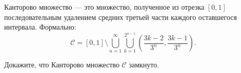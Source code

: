 \begin{definition}
	Канторово множество — это множество, полученное из отрезка $[0,1]$ последовательным удалением средних третьей части каждого оставшегося интервала. Формально:  
\[
\mathcal{C} = [0,1] \setminus \bigcup_{n=1}^\infty \bigcup_{k=1}^{2^{n-1}} \left( \frac{3k-2}{3^n}, \frac{3k-1}{3^n} \right).
\]  

\end{definition}

\begin{task}
	Докажите, что Канторово множество $\mathcal{C}$ замкнуто.  
\end{task}


